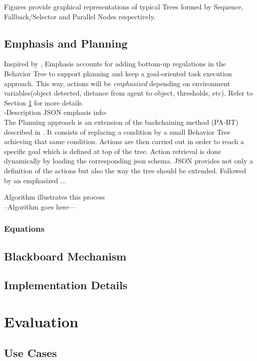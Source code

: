 \documentclass[letterpaper, 10 pt, conference]{ieeeconf}  %
\begin{document}
Figures provide graphical representations of typical Trees formed by Sequence, Fallback/Selector and Parallel Nodes respectively.

\subsection{Emphasis and Planning}
\label{em-p}
Inspired by \cite{c6}, Emphasis accounts for adding bottom-up regulations in the Behavior Tree to support planning and keep a goal-oriented task execution approach. This way, actions will be \textit{emphasized} depending on environment variables(object detected, distance from agent to object, thresholds, etc). Refer to Section \ref{evaluation} for more details.\\


-Description JSON emphasis info-\\
The Planning approach is an extension of the backchaining method (PA-BT) described in \cite{1}. It consists of replacing a condition by a small Behavior Tree achieving that same condition. Actions are then carried out in order to reach a specific goal which is defined at top of the tree. Action retrieval is done dynamically by loading the corresponding json schema. JSON provides not only a definition of the actions but also the way the tree should be extended. Followed by an emphasized ...

Algorithm illustrates this process\\
--Algorithm goes here---\\
\subsubsection{Equations}
\subsection{Blackboard Mechanism}
\subsection{Implementation Details}

\section{Evaluation}
\label{evaluation}
\subsection{Use Cases}
\end{document}

